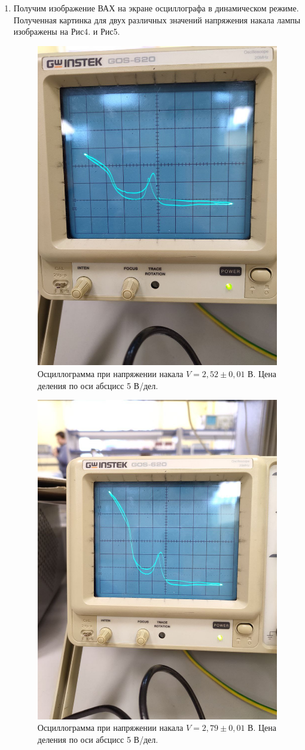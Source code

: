 \documentclass[a4paper, 12pt]{article}%
\begin{document}
	\begin{enumerate}
	
	\item Получим изображение ВАХ на экране осциллографа в динамическом режиме. Полученная  картинка для двух различных значений напряжения накала лампы изображены на Рис4. и Рис5.
	
	\begin{figure}[H]
		\centering
		\includegraphics[width=0.6\linewidth]{2.519.jpeg}
		\caption{Осциллограмма при напряжении накала $V = 2,52 \pm0,01$ В.  Цена деления по оси абсцисс 5 В/дел.}
	\end{figure}

	\begin{figure}[H]
		\centering
		\includegraphics[width=0.6\linewidth]{2.794.jpeg}
		\caption{Осциллограмма при напряжении накала $V = 2,79 \pm0,01$ В. Цена деления по оси абсцисс 5 В/дел.}
	\end{figure}


\end{enumerate}
\end{document}
